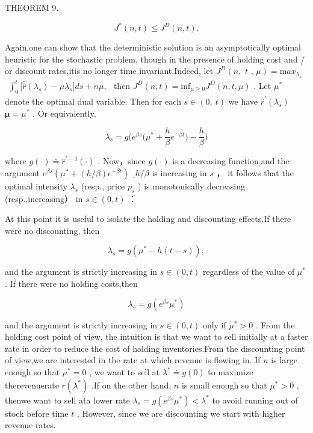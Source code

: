 THEOREM 9.

\[
J ^ { * } ( n , t ) \leq J ^ { D } ( n , t ) .
\]

Again,one can show that the deterministic solution is an asymptotically
optimal heuristic for the stochastic problem, though in the presence of
holding cost and / or discount rates,itis no longer time
invariant.Indeed, let
\(J ^ { D } ( n , \textit { t , } \mu ) = \mathrm { m } a x _ { \lambda _ { s } }\)
\(\begin{array} { r } { \int _ { 0 } ^ { t } \big [ \bar { \hat { r } } ( \lambda _ { s } ) - \mu \lambda _ { s } \big ] d s + n \mu , } \end{array}\)
then
\(J ^ { D } ( n , t ) = \mathrm { i n f } _ { \mu \geq 0 } J ^ { D } ( n , t , \mu )\)
. Let \(\mu ^ { * }\) denote the optimal dual variable. Then for each
\(s \in ( 0 , \ t )\) we have
\(\hat { r } ^ { \prime } ( \lambda _ { s } )\)
\(\mathbf { \mu } = \mu ^ { * }\) . Or equivalently,

\[
\lambda _ { s } = g \bigg ( e ^ { \beta s } \bigg ( \mu ^ { * } + \frac { h } { \beta } e ^ { - \beta t } \bigg ) - \frac { h } { \beta } \bigg )
\]

where \(g ( \cdot ) \doteq \hat { r } ^ { \prime - 1 } ( \cdot )\) .
Now，since \(g ( \cdot )\) is a decreasing function,and the argument
\(e ^ { \beta s } ( \mu ^ { * } + ( h / \beta ) e ^ { - \beta t } )\)
\(\_ h / \beta\) is increasing in \(s\) ， it follows that the optimal
intensity \(\lambda _ { s }\) (resp., price \(p _ { s }\) ) is
monotonically decreasing (resp.,increasing） in \(s \in ( 0 , t )\) ：

At this point it is useful to isolate the holding and discounting
effects.If there were no discounting, then

\[
\lambda _ { s } = g ( \mu ^ { * } - h ( t - s ) ) ,
\]

and the argument is strictly increasing in \(s \in ( 0 , t )\)
regardless of the value of \(\mu ^ { * }\) . If there were no holding
costs,then

\[
\lambda _ { s } = g ( e ^ { \beta s } \mu ^ { \ast } )
\]

and the argument is strictly increasing in \(s \in ( 0 , t )\) only if
\(\mu ^ { * } > 0\) . From the holding cost point of view, the intuition
is that we want to sell initially at a faster rate in order to reduce
the cost of holding inventories.From the discounting point of view,we
are interested in the rate at which revenue is flowing in. If \(n\) is
large enough so that \(\mu ^ { * } = 0\) , we want to sell at
\(\lambda ^ { * } \doteq g ( 0 )\) to maximize therevenuerate
\(r ( \lambda ^ { * } )\) .If on the other hand, \(n\) is small enough
so that \(\mu ^ { * } > 0\) , thenwe want to sell ata lower rate
\(\lambda _ { s } = g ( e ^ { \beta s } \mu ^ { * } ) < \lambda ^ { * }\)
to avoid running out of stock before time \(t\) . However, since we are
discounting we start with higher revenue rates.

